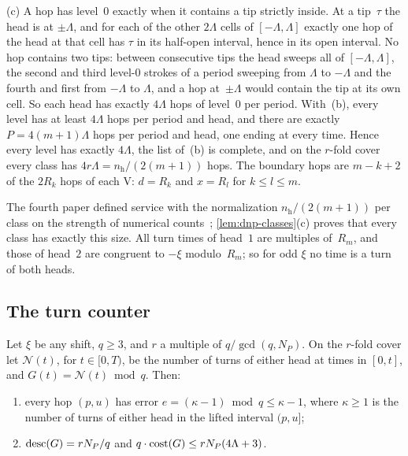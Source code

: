 \begin{informalproof}
(c) A hop has level~$0$ exactly when it contains a tip strictly inside. At a tip~$\tau$ the head is at $\pm\Lambda$, and for
each of the other $2\Lambda$ cells of $[-\Lambda,\Lambda]$ exactly one hop of the head at that cell has $\tau$ in its
half-open interval, hence in its open interval. No hop contains two tips: between consecutive tips the head sweeps all of
$[-\Lambda,\Lambda]$, the second and third level-$0$ strokes of a period sweeping from $\Lambda$ to $-\Lambda$ and the fourth
and first from $-\Lambda$ to $\Lambda$, and a hop at~$\pm\Lambda$ would contain the tip at its own cell. So each head has
exactly $4\Lambda$ hops of level~$0$ per period. With~(b), every level has at least $4\Lambda$ hops per period and head, and
there are exactly $P=4(m+1)\Lambda$ hops per period and head, one ending at every time. Hence every level has exactly
$4\Lambda$, the list of~(b) is complete, and on the $r$-fold cover every class has $4r\Lambda=n_{\mathrm h}/(2(m+1))$ hops.
The boundary hops are $m-k+2$ of the $2R_k$ hops of each V: $d=R_k$ and $x=R_l$ for $k\le l\le m$.
\end{informalproof}

The fourth paper defined service with the normalization $n_{\mathrm h}/(2(m+1))$ per class on the strength of numerical
counts~\cite[Section~5.7]{FourthPaper2026}; \cref{lem:dnp-classes}(c) proves that every class has exactly this size. All
turn times of head~$1$ are multiples of~$R_m$, and those of head~$2$ are congruent to $-\xi$ modulo~$R_m$; so for odd
$\xi$ no time is a turn of both heads.

\subsection{The turn counter}\label{sec:dnp-counter}

\begin{theorem}\label{thm:counter}
Let $\xi$ be any shift, $q\ge3$, and $r$ a multiple of $q/\gcd(q,N_P)$. On the $r$-fold cover let $\mathcal N(t)$, for
$t\in[0,T)$, be the number of turns of either head at times in $[0,t]$, and $G(t)=\mathcal N(t)\bmod q$. Then:
\begin{enumerate}[label=(\arabic*)]
\item every hop $(p,u)$ has error $e=(\kappa-1)\bmod q\le\kappa-1$, where $\kappa\ge1$ is the number of turns of either
head in the lifted interval $(p,u]$;
\item $\mathrm{desc}(G)=rN_P/q$ and $q\cdot\mathrm{cost}(G)\le rN_P(4\Lambda+3)$.
\end{enumerate}
\end{theorem}

